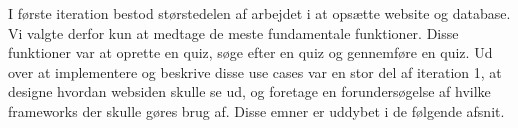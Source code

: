 I første iteration bestod størstedelen af arbejdet i at opsætte website og database. Vi valgte derfor kun at medtage de meste fundamentale funktioner. Disse funktioner var at oprette en quiz, søge efter en quiz og gennemføre en quiz. Ud over at implementere og beskrive disse use cases var en stor del af iteration 1, at designe hvordan websiden skulle se ud, og foretage en forundersøgelse af hvilke frameworks der skulle gøres brug af. Disse emner er uddybet i de følgende afsnit.


















